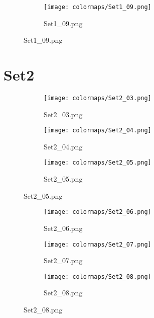 \documentclass{article}%
\begin{document}
%
\hspace{1cm}\hfill%


\begin{figure}[h!]%
\begin{subfigure}[b]{0.3\linewidth}%
\texttt{[image: colormaps/Set1\_09.png]}%
\caption{Set1\_09.png}%
\end{subfigure}%
\end{figure}

%
\newpage%
\section{Set2}%
\label{sec:Set2}%
\hspace{1cm}\hfill%
\hspace{1cm}\hfill%
\hspace{1cm}\hfill%


\begin{figure}[h!]%
\begin{subfigure}[b]{0.3\linewidth}%
\texttt{[image: colormaps/Set2\_03.png]}%
\caption{Set2\_03.png}%
\end{subfigure}%
\begin{subfigure}[b]{0.3\linewidth}%
\texttt{[image: colormaps/Set2\_04.png]}%
\caption{Set2\_04.png}%
\end{subfigure}%
\begin{subfigure}[b]{0.3\linewidth}%
\texttt{[image: colormaps/Set2\_05.png]}%
\caption{Set2\_05.png}%
\end{subfigure}%
\end{figure}

%
\hspace{1cm}\hfill%
\hspace{1cm}\hfill%
\hspace{1cm}\hfill%


\begin{figure}[h!]%
\begin{subfigure}[b]{0.3\linewidth}%
\texttt{[image: colormaps/Set2\_06.png]}%
\caption{Set2\_06.png}%
\end{subfigure}%
\begin{subfigure}[b]{0.3\linewidth}%
\texttt{[image: colormaps/Set2\_07.png]}%
\caption{Set2\_07.png}%
\end{subfigure}%
\begin{subfigure}[b]{0.3\linewidth}%
\texttt{[image: colormaps/Set2\_08.png]}%
\caption{Set2\_08.png}%
\end{subfigure}%
\end{figure}
\end{document}
